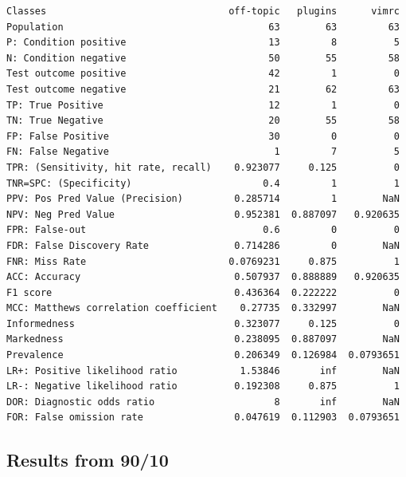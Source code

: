 \documentclass[12pt, a4paper]{article}
\begin{document}
\begin{verbatim}
Classes                                off-topic   plugins      vimrc  
Population                                    63        63         63  
P: Condition positive                         13         8          5  
N: Condition negative                         50        55         58  
Test outcome positive                         42         1          0  
Test outcome negative                         21        62         63  
TP: True Positive                             12         1          0  
TN: True Negative                             20        55         58  
FP: False Positive                            30         0          0  
FN: False Negative                             1         7          5  
TPR: (Sensitivity, hit rate, recall)    0.923077     0.125          0  
TNR=SPC: (Specificity)                       0.4         1          1  
PPV: Pos Pred Value (Precision)         0.285714         1        NaN  
NPV: Neg Pred Value                     0.952381  0.887097   0.920635  
FPR: False-out                               0.6         0          0  
FDR: False Discovery Rate               0.714286         0        NaN  
FNR: Miss Rate                         0.0769231     0.875          1  
ACC: Accuracy                           0.507937  0.888889   0.920635  
F1 score                                0.436364  0.222222          0  
MCC: Matthews correlation coefficient    0.27735  0.332997        NaN  
Informedness                            0.323077     0.125          0  
Markedness                              0.238095  0.887097        NaN  
Prevalence                              0.206349  0.126984  0.0793651  
LR+: Positive likelihood ratio           1.53846       inf        NaN  
LR-: Negative likelihood ratio          0.192308     0.875          1  
DOR: Diagnostic odds ratio                     8       inf        NaN  
FOR: False omission rate                0.047619  0.112903  0.0793651  
\end{verbatim}

\newpage
\label{sec:9090}
\subsection{Results from 90/10}
\end{document}
